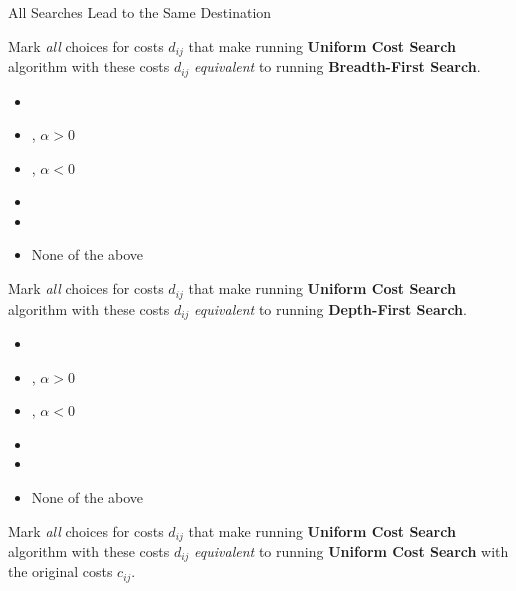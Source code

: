 \begin{problem}{All Searches Lead to the Same Destination}
\begin{question}[2]
Mark \emph{all} choices for costs $d_{ij}$ that make running {\bf
  Uniform Cost Search} algorithm with these costs $d_{ij}$ 
\emph{equivalent} to running {\bf Breadth-First Search}.  
	\begin{itemize}	
	\item[] \solution{\emptycircle}{\Twoai}  
	\item[] \solution{\emptycircle}{\Twoaii}  , ${\alpha > 0}$
	\item[]\solution{\emptycircle}{\Twoaiii}  , ${\alpha < 0}$
	\item[]\solution{\emptycircle}{\Twoaiv}  
	\item[]\solution{\emptycircle}{\Twoav}  
	\item[]\solution{\emptycircle}{\Twoavi} None of the above
	\end{itemize}\solution{\vspace{1cm}}{}\end{question}
\begin{question}[2]
Mark \emph{all} choices for costs $d_{ij}$ that make running {\bf
  Uniform Cost Search} algorithm with these costs $d_{ij}$ 
\emph{equivalent} to running {\bf Depth-First Search}.
	\begin{itemize}	
	\item[] \solution{\emptycircle}{\Twobi}  
	\item[] \solution{\emptycircle}{\Twobii}  , ${\alpha > 0}$
	\item[]\solution{\emptycircle}{\Twobiii}  , ${\alpha < 0}$
	\item[]\solution{\emptycircle}{\Twobiv}  
	\item[]\solution{\emptycircle}{\Twobv}  
	\item[]\solution{\emptycircle}{\Twobvi} None of the above
	\end{itemize}\solution{\vspace{1cm}}{}\end{question}
\newpage
\begin{question}[2]
Mark \emph{all} choices for costs $d_{ij}$  that make running {\bf
  Uniform Cost Search} algorithm with these costs $d_{ij}$ 
\emph{equivalent} to running {\bf Uniform Cost Search} with the
original costs $c_{ij}$.
	\begin{itemize}

\end{itemize}
\end{question}
\end{problem}
